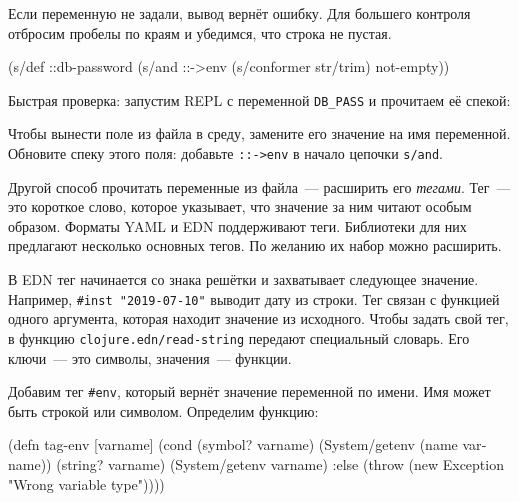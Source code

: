 \fi

Если переменную не задали, вывод вернёт ошибку. Для большего контроля
отбросим пробелы по краям и убедимся, что строка не пустая.

\begin{english}
  \begin{clojure}
(s/def ::db-password
  (s/and ::->env
         (s/conformer str/trim)
         not-empty))
  \end{clojure}
\end{english}

Быстрая проверка: запустим REPL с переменной \verb|DB_PASS| и прочитаем её
спекой:

\begin{english}
  \begin{bash}
DB_PASS='*(&fd}A53z#$!' lein repl

(s/conform ::db-password "DB_PASS")
"*(&fd}A53z#$!"
  \end{bash}
\end{english}

Чтобы вынести поле из файла в среду, замените его значение на имя
переменной. Обновите спеку этого поля: добавьте \verb|::->env| в начало цепочки
\verb|s/and|.


Другой способ прочитать переменные из файла~--- расширить его \emph{тегами}. Тег~---
это короткое слово, которое указывает, что значение за ним читают особым
образом. Форматы YAML и EDN поддерживают теги. Библиотеки для них предлагают
несколько основных тегов. По желанию их набор можно расширить.


В EDN тег начинается со знака решётки и захватывает следующее
значение. Например, \verb|#inst "2019-07-10"| выводит дату из строки. Тег связан
с функцией одного аргумента, которая находит значение из исходного. Чтобы задать
свой тег, в функцию \verb|clojure.edn/read-string| передают специальный
словарь. Его ключи~--- это символы, значения~--- функции.

Добавим тег \verb|#env|, который вернёт значение переменной по имени. Имя
может быть строкой или символом. Определим функцию:

\ifx\devicetype\mobile

\begin{english}
  \begin{clojure}
(defn tag-env
  [varname]
  (cond
    (symbol? varname)
    (System/getenv (name varname))
    (string? varname)
    (System/getenv varname)
    :else
    (throw
      (new Exception
        "Wrong variable type"))))
  \end{clojure}
\end{english}

